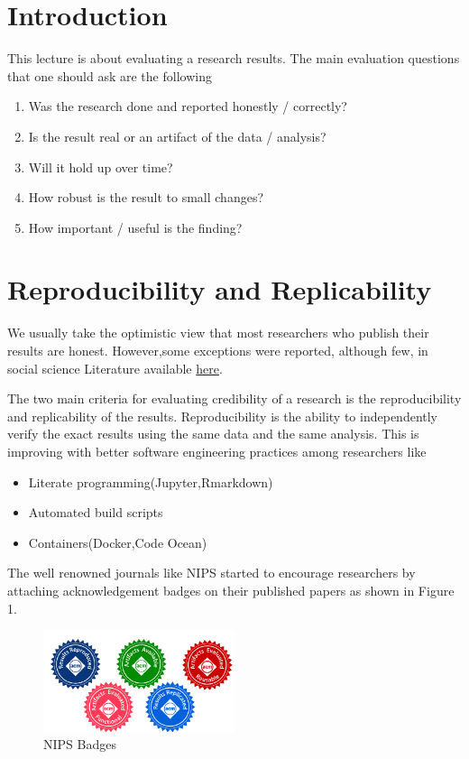 \section{Introduction}
This lecture is about evaluating a research results. The main evaluation questions that one should ask are the following
\begin{enumerate}
  \item Was the research done and reported honestly / correctly?
  \item Is the result real or an artifact of the data / analysis?
  \item Will it hold up over time?
  \item How robust is the result to small changes?
  \item	How important / useful is the finding?
\end{enumerate}
\section{Reproducibility and Replicability}
We usually take the optimistic view that most researchers who publish their results are honest. However,some exceptions were reported, although few, in social science Literature available \href{https://en.wikipedia.org/wiki/List_of_scientific_misconduct_incidents#Social_sciences}{here}.

The two main criteria for evaluating credibility of a research is the reproducibility and replicability of the results. Reproducibility is the ability to independently verify the exact results using the same data and the same analysis. 
This is improving with better software engineering practices among researchers like

\begin{itemize}
  \item Literate programming(Jupyter,Rmarkdown)
  \item Automated build scripts
  \item Containers(Docker,Code Ocean)
\end{itemize}

The well renowned journals like NIPS started to encourage researchers by attaching acknowledgement badges on their published papers as shown in Figure 1. 

\begin{figure} [ht]
  \begin{center}
    \includegraphics[width=0.5\textwidth]{figures/badges.png}
    \caption{
    NIPS Badges
      }
    \label{fig:badges}
  \end{center}
\end{figure}


